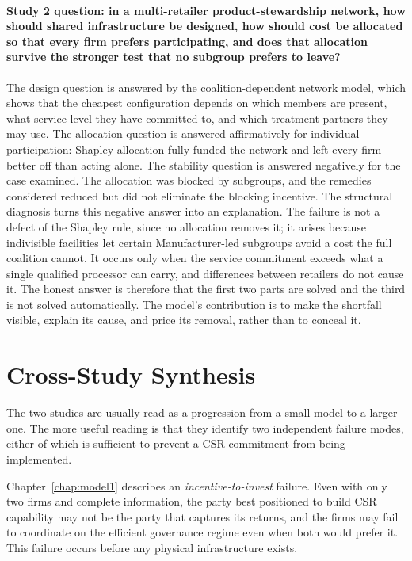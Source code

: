 \paragraph{Study 2 question: in a multi-retailer product-stewardship network, how should shared infrastructure be designed, how should cost be allocated so that every firm prefers participating, and does that allocation survive the stronger test that no subgroup prefers to leave?}
The design question is answered by the coalition-dependent network model, which shows that the cheapest configuration depends on which members are present, what service level they have committed to, and which treatment partners they may use. The allocation question is answered affirmatively for individual participation: Shapley allocation fully funded the network and left every firm better off than acting alone. The stability question is answered negatively for the case examined. The allocation was blocked by subgroups, and the remedies considered reduced but did not eliminate the blocking incentive. The structural diagnosis turns this negative answer into an explanation. The failure is not a defect of the Shapley rule, since no allocation removes it; it arises because indivisible facilities let certain Manufacturer-led subgroups avoid a cost the full coalition cannot. It occurs only when the service commitment exceeds what a single qualified processor can carry, and differences between retailers do not cause it. The honest answer is therefore that the first two parts are solved and the third is not solved automatically. The model's contribution is to make the shortfall visible, explain its cause, and price its removal, rather than to conceal it.

\section{Cross-Study Synthesis}
\label{sec:ch5_synthesis}

The two studies are usually read as a progression from a small model to a larger one. The more useful reading is that they identify two independent failure modes, either of which is sufficient to prevent a CSR commitment from being implemented.

Chapter~\ref{chap:model1} describes an \emph{incentive-to-invest} failure. Even with only two firms and complete information, the party best positioned to build CSR capability may not be the party that captures its returns, and the firms may fail to coordinate on the efficient governance regime even when both would prefer it. This failure occurs before any physical infrastructure exists.

